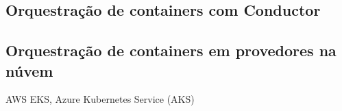 \subsection{Orquestração de containers com Conductor}

\subsection{Orquestração de containers em provedores na núvem}
AWS EKS, Azure Kubernetes Service (AKS)










